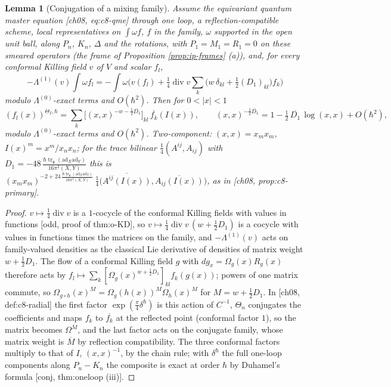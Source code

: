 \documentclass[11pt]{report}
\theoremstyle{plain}
\newtheorem{lemma}[theorem]{Lemma}
\theoremstyle{definition}
\numberwithin{equation}{chapter}
\newcommand{\unit}{\tfrac{\hbar\operatorname{tr}_{\mathfrak g}(\mathrm{ad}_X\mathrm{ad}_Y)}{16\pi^2(X,Y)}}
\begin{document}
\begin{lemma}[Conjugation of a mixing family]
\label{lem:ip-W}
Assume the equivariant quantum master equation [ch08, eq:c8-qme] through one loop, a reflection-compatible scheme, local representatives on $\int\omega f$, $f$ in the family, $\omega$ supported in the open unit ball, along $P_n$, $K_n$, $\Delta$ and the rotations, with $P_1=M_1=R_1=0$ on these smeared operators (the frame of Proposition \ref{prop:ip-frames} (a)), and, for every conformal Killing field $v$ of $V$ and scalar $f_l$,
\[
-\Lambda^{(1)}(v)\int\omega f_l=-\int\omega\Big(v(f_l)+\tfrac14\operatorname{div}v\sum_k\big(w\,\delta_{kl}+\tfrac12(D_1)_{kl}\big)f_k\Big)
\]
modulo $\Lambda^{(0)}$-exact terms and $O(\hbar^2)$. Then for $0<|x|<1$
\begin{equation}
(f_l(x))^{\Theta_I,\hbar}=\sum_k\Big[(x,x)^{-w-\frac12\overline{D_1}}\Big]_{kl}\,\overline{f_k}(I(x)),\qquad (x,x)^{-\frac12\overline{D_1}}=1-\tfrac12\,\overline{D_1}\,\log(x,x)+O(\hbar^2),
\label{eq:ip-W}
\end{equation}
modulo $\Lambda^{(0)}$-exact terms and $O(\hbar^2)$. Two-component: $(x,x)=x_mx_m$, $I(x)^m=x^m/x_nx_n$; for the trace bilinear $\tfrac14(A^{ij},A_{ij})$ with $D_1=-48\,\unit$ this is $(x_mx_m)^{-2+24\,\frac{\hbar\operatorname{tr}_{\mathfrak g}(\mathrm{ad}_X\mathrm{ad}_Y)}{16\pi^2(X,Y)}}\,\tfrac14\big(\overline{A^{ij}(I(x))},\overline{A_{ij}(I(x))}\big)$, as in [ch08, prop:c8-primary].
\end{lemma}

\begin{proof}
$v\mapsto\tfrac14\operatorname{div}v$ is a $1$-cocycle of the conformal Killing fields with values in functions [odd, proof of thm:o-KD], so $v\mapsto\tfrac14\operatorname{div}v\,(w+\tfrac12D_1)$ is a cocycle with values in functions times the matrices on the family, and $-\Lambda^{(1)}(v)$ acts on family-valued densities as the classical Lie derivative of densities of matrix weight $w+\tfrac12D_1$. The flow of a conformal Killing field $g$ with $dg_x=\Omega_g(x)R_g(x)$ therefore acts by $f_l\mapsto\sum_k[\Omega_g(x)^{w+\frac12D_1}]_{kl}f_k(g(x))$; powers of one matrix commute, so $\Omega_{g\circ h}(x)^{M}=\Omega_g(h(x))^{M}\Omega_h(x)^{M}$ for $M=w+\tfrac12D_1$. In [ch08, def:c8-radial] the first factor $\exp(\tfrac\pi4\delta^\hbar)$ is this action of $C^{-1}$, $\Theta_n$ conjugates the coefficients and maps $f_k$ to $\overline{f_k}$ at the reflected point (conformal factor $1$), so the matrix becomes $\Omega^{\overline M}$, and the last factor acts on the conjugate family, whose matrix weight is $\overline M$ by reflection compatibility. The three conformal factors multiply to that of $I$, $(x,x)^{-1}$, by the chain rule; with $\delta^\hbar$ the full one-loop components along $P_n-K_n$ the composite is exact at order $\hbar$ by Duhamel's formula [conj, thm:oneloop (iii)].
\end{proof}
\end{document}
